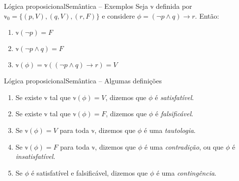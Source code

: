 \begin{frame}{Lógica proposicional}{Semântica -- Exemplos}
	Seja $\mathbb{v}$ definida por $\mathbb{v}_0 = \{(p,V),(q,V),(r,F) \}$ e considere $\phi = (\neg p \wedge q) \rightarrow r$. Então:
	\begin{enumerate}
		\pause\item $\mathbb{v}(\neg p) = F$
		\pause\item $\mathbb{v}(\neg p \wedge q) = F$
		\pause\item $\mathbb{v}(\phi) = \mathbb{v}((\neg p \wedge q) \rightarrow r) = V$
	\end{enumerate}
\end{frame}

\begin{frame}{Lógica proposicional}{Semântica -- Algumas definições}
	\begin{enumerate}
		\item Se existe $\mathbb{v}$ tal que $\mathbb{v}(\phi) = V$, dizemos que $\phi$ é \emph{satisfatível}.
		\pause\item Se existe $\mathbb{v}$ tal que $\mathbb{v}(\phi) = F$, dizemos que $\phi$ é \emph{falsificável}.
		\pause\item Se $\mathbb{v}(\phi) = V$ para toda $\mathbb{v}$, dizemos que $\phi$ é uma \emph{tautologia}.
		\pause\item Se $\mathbb{v}(\phi) = F$ para toda $\mathbb{v}$, dizemos que $\phi$ é uma \emph{contradição}, ou que $\phi$ é \emph{insatisfatível}.
		\pause\item Se $\phi$ é satisfatível e falsificável, dizemos que $\phi$ é uma \emph{contingência}.
	\end{enumerate}
\end{frame}

